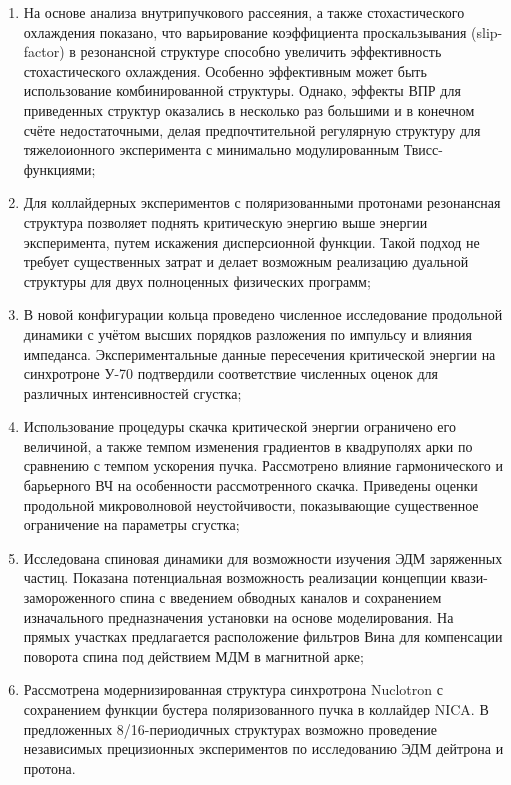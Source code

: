 \begin{enumerate}

  \item На основе анализа внутрипучкового рассеяния, а также стохастического охлаждения показано, что варьирование коэффициента проскальзывания (slip-factor) в резонансной структуре способно увеличить эффективность стохастического охлаждения. Особенно эффективным может быть использование комбинированной структуры. Однако, эффекты ВПР для приведенных структур оказались в несколько раз большими и в конечном счёте недостаточными, делая предпочтительной регулярную структуру для тяжелоионного эксперимента с минимально модулированным Твисс-функциями;
  
  \item Для коллайдерных экспериментов с поляризованными протонами резонансная структура позволяет поднять критическую энергию выше энергии эксперимента, путем искажения дисперсионной функции. Такой подход не требует существенных затрат и делает возможным реализацию дуальной структуры для двух полноценных физических программ;
  
  \item В новой конфигурации кольца проведено численное исследование продольной динамики с учётом высших порядков разложения по импульсу и влияния импеданса. Экспериментальные данные пересечения критической энергии на синхротроне У-70 подтвердили соответствие численных оценок для различных интенсивностей сгустка;
  
  \item Использование процедуры скачка критической энергии ограничено его величиной, а также темпом изменения градиентов в квадруполях арки по сравнению с темпом ускорения пучка. Рассмотрено влияние гармонического и барьерного ВЧ на особенности рассмотренного скачка. Приведены оценки продольной микроволновой неустойчивости, показывающие существенное ограничение на параметры сгустка;
  
  \item Исследована спиновая динамики для возможности изучения ЭДМ заряженных частиц. Показана потенциальная возможность реализации концепции квази-замороженного спина с введением обводных каналов и сохранением изначального предназначения установки на основе моделирования. На прямых участках предлагается расположение фильтров Вина для компенсации поворота спина под действием МДМ в магнитной арке;
  
  \item Рассмотрена модернизированная структура синхротрона Nuclotron с сохранением функции бустера поляризованного пучка в коллайдер NICA. В предложенных 8/16-периодичных структурах возможно проведение независимых прецизионных экспериментов по исследованию ЭДМ дейтрона и протона.
  
\end{enumerate}


